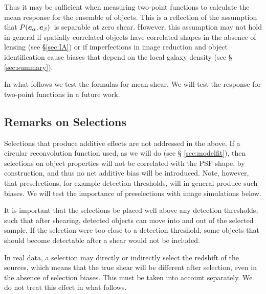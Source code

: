\documentclass[iop]{emulateapj}
\newcommand{\vest}{\mbox{\boldmath $e$}}
\newcommand{\mcalRscalarmean}{\mbox{$\langle R \rangle$}}
\newcommand{\probe}{\mbox{$P(\vest_\alpha, \vest_\beta)$}}
\begin{document}
Thus it may be sufficient when measuring two-point functions to calculate the
mean response for the ensemble of objects.  This is a reflection of the
assumption that \probe\ is separable at zero shear.  However, this
assumption may not hold in general if spatially correlated objects have
correlated shapes in the absence of lensing (see \S \ref{sec:IA}) or if
imperfections in image reduction and object identification cause
biases that depend on the local galaxy density (see \S
\ref{sec:summary}).


In what follows we test the formulas for mean shear.  We will test the
response for two-point functions in a future work.

\subsection{Remarks on Selections}

Selections that produce additive effects are not addressed in the above.  If a
circular reconvolution function used, as we will do (see \S
\ref{sec:modelfit}), then selections on object properties will not be
correlated with the PSF shape, by construction, and thus no net additive bias
will be introduced. Note, however, that preselections, for example detection
thresholds, will in general produce such biases.  We will test the importance
of preselections with image simulations below.


It is important that the selections be placed well above any detection
thresholds, such that after shearing, detected objects can move into and out
of the selected sample.  If the selection were too close to a detection
threshold, some objects that should become detectable after
a shear would not be included.

In real data, a selection may directly or indirectly select the redshift of the
sources, which means that the true shear will be different after selection,
even in the absence of selection biases.  This must be taken into account
separately.  We do not treat this effect in what follows.
\end{document}
